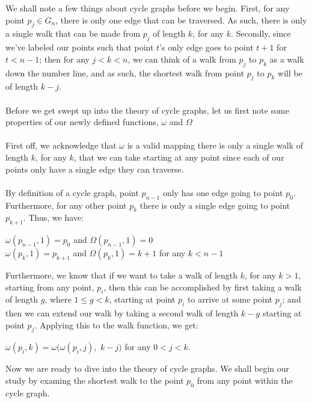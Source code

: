 \documentclass[a4paper,12pt]{article}
\begin{document}
We shall note a few things about cycle graphs before we begin. First, for any point $p_j \in G_n$, there is only one edge that can be traversed. As such, there is only a single walk that can be made from $p_j$ of length $k$, for any $k$. Secondly, since we've labeled our points such that point $t$'s only edge goes to point $t + 1$ for $t < n - 1$; then for any $j < k < n$, we can think of a walk from $p_j$ to $p_k$ as a walk down the number line, and as such, the shortest walk from point $p_j$ to $p_k$ will be of length $k - j$.\\
\\

Before we get swept up into the theory of cycle graphs, let us first note some properties of our newly defined functions, $\omega$ and $\Omega$\\
\\
First off, we acknowledge that $\omega$ is a valid mapping there is only a single walk of length $k$, for any $k$, that we can take starting at any point since each of our points only have a single edge they can traverse.\\
\\
By definition of a cycle graph, point $p_{n-1}$ only has one edge going to point $p_0$. Furthermore, for any other point $p_k$ there is only a single edge going to point $p_{k+1}$. Thus, we have:
\begin{center}
$\omega(p_{n-1}, 1) = p_0$ and $\Omega(p_{n-1}, 1) = 0$\\
$\omega(p_k, 1) = p_{k+1}$ and $\Omega(p_k, 1) = k + 1$ for any $k < n - 1$\\
\end{center}
\noindent
Furthermore, we know that if we want to take a walk of length $k$, for any $k > 1$, starting from any point, $p_i$, then this can be accomplished by first taking a walk of length $g$, where $1 \leq g < k$, starting at point $p_i$ to arrive at some point $p_j$; and then we can extend our walk by taking a second walk of length $k - g$ starting at point $p_j$. Applying this to the walk function, we get:
\begin{center}
$\omega(p_i, k) = \omega(\omega(p_i, j),$ $k - j)$ for any $0 < j < k$.
\end{center}
Now we are ready to dive into the theory of cycle graphs. We shall begin our study by examing the shortest walk to the point $p_0$ from any point within the cycle graph.\\
\end{document}
